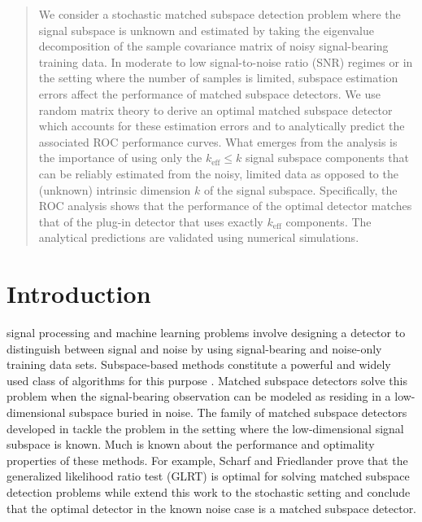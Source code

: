\begin{abstract}
We consider a stochastic  matched subspace detection problem where the signal subspace is unknown and estimated by taking the eigenvalue decomposition of the sample covariance matrix of noisy signal-bearing training data. In moderate to low signal-to-noise ratio (SNR) regimes or in the setting where the number of samples is limited, subspace estimation errors affect the performance of matched subspace detectors. We use random matrix theory to derive an optimal matched subspace detector which accounts for these estimation errors and to analytically predict the associated ROC performance curves. What emerges from the analysis is the importance of using only the $k_\text{eff} \leq k$ signal subspace components that can be reliably estimated from the noisy, limited data as opposed to the (unknown) intrinsic dimension $k$ of the signal subspace. Specifically, the ROC analysis shows that the performance of the optimal detector matches that of the plug-in detector that uses exactly $k_\text{eff}$ components. The analytical predictions are validated using numerical simulations.
\end{abstract}

\section{Introduction}

 signal processing and machine learning problems involve designing a detector to distinguish between signal and noise by using signal-bearing and noise-only training data sets. Subspace-based methods constitute a powerful and widely used class of algorithms for this purpose \cite{hastie2001elements,laaksonen1996subspace,scharf1994matched,jin2005cfar,mcwhorter2003matched}. Matched subspace detectors  solve this problem when the signal-bearing observation can be modeled as residing in a low-dimensional subspace buried in noise. The family of matched subspace detectors developed in \cite{scharf1994matched,jin2005cfar,mcwhorter2003matched} tackle the problem in the setting where the low-dimensional signal subspace is known. Much is known about the performance and optimality properties of these methods. For example, Scharf and Friedlander \cite{scharf1994matched} prove that the generalized likelihood ratio test (GLRT) is optimal for solving matched subspace detection problems while \cite{mcwhorter2003matched} extend this work to the stochastic setting and conclude that the optimal detector in the known noise case is a matched subspace detector.

